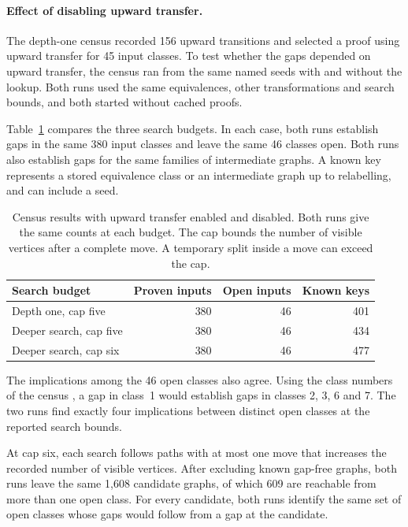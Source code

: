 \paragraph{Effect of disabling upward transfer.}
The depth-one census recorded 156 upward transitions and selected a proof
using upward transfer for 45 input classes. To test whether the gaps
depended on upward transfer, the census ran from the same named seeds
with and without the lookup. Both runs used the same equivalences,
other transformations and search bounds, and both started without
cached proofs.

Table~\ref{tab:ablation} compares the three search budgets. In each case,
both runs establish gaps in the same 380 input classes and leave the
same 46 classes open. Both runs also establish gaps for the same families
of intermediate graphs. A known key represents a stored equivalence
class or an intermediate graph up to relabelling, and can include a seed.

\begin{table}[htbp]
\centering
\caption{Census results with upward transfer enabled and disabled. Both runs
give the same counts at each budget. The cap bounds the number of visible
vertices after a complete move. A temporary split inside a move can exceed
the cap.}\label{tab:ablation}
\begin{tabular}{@{}lrrr@{}}
\toprule
Search budget & Proven inputs & Open inputs & Known keys\\
\midrule
Depth one, cap five & 380 & 46 & 401\\
Deeper search, cap five & 380 & 46 & 434\\
Deeper search, cap six & 380 & 46 & 477\\
\bottomrule
\end{tabular}
\end{table}

The implications among the 46 open classes also agree. Using the class
numbers of the census \cite{Open}, a gap in class~1 would establish gaps
in classes 2, 3, 6 and 7. The two runs find exactly four implications
between distinct open classes at the reported search bounds.

At cap six, each search follows paths with at most one move that increases
the recorded number of visible vertices. After excluding known gap-free
graphs, both runs leave the same 1,608 candidate graphs, of which 609 are
reachable from more than one open class. For every candidate, both runs
identify the same set of open classes whose gaps would follow from a gap
at the candidate.

